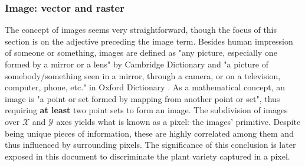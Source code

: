 \subsubsection{Image: vector and raster}
\label{sec:rs_data_formats}

The concept of images seems very straightforward, though the focus of this section is on the adjective preceding the image term. Besides human impression of someone or something, images are defined as "any picture, especially one formed by a mirror or a lens" by Cambridge Dictionary \cite{cambridge_english_dictionary_cambridge_2023} and "a picture of somebody/something seen in a mirror, through a camera, or on a television, computer, phone, etc." in Oxford Dictionary \cite{oxford_university_press_oxford_2023}. As a mathematical concept, an image is "a point or set formed by mapping from another point or set", thus requiring \textbf{at least} two point sets to form an image. The subdivision of images over $\mathcal{X}$ and $\mathcal{Y}$ axes yields what is known as a pixel: the images' primitive. Despite being unique pieces of information, these are highly correlated among them and thus influenced by surrounding pixels. The significance of this conclusion is later exposed in this document to discriminate the plant variety captured in a pixel.

